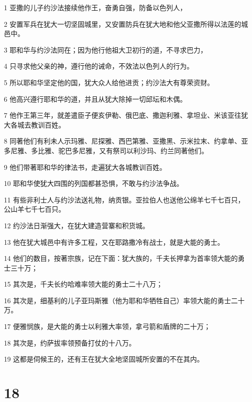 \par 1 亚撒的儿子约沙法接续他作王，奋勇自强，防备以色列人，
\par 2 安置军兵在犹大一切坚固城里，又安置防兵在犹大地和他父亚撒所得以法莲的城邑中。
\par 3 耶和华与约沙法同在；因为他行他祖大卫初行的道，不寻求巴力，
\par 4 只寻求他父亲的神，遵行他的诫命，不效法以色列人的行为。
\par 5 所以耶和华坚定他的国，犹大众人给他进贡；约沙法大有尊荣资财。
\par 6 他高兴遵行耶和华的道，并且从犹大除掉一切邱坛和木偶。
\par 7 他作王第三年，就差遣臣子便亥伊勒、俄巴底、撒迦利雅、拿坦业、米该亚往犹大各城去教训百姓。
\par 8 同著他们有利未人示玛雅、尼探雅、西巴第雅、亚撒黑、示米拉末、约拿单、亚多尼雅、多比雅、驼巴多尼雅，又有祭司以利沙玛、约兰同著他们。
\par 9 他们带著耶和华的律法书，走遍犹大各城教训百姓。
\par 10 耶和华使犹大四围的列国都甚恐惧，不敢与约沙法争战。
\par 11 有些非利士人与约沙法送礼物，纳贡银。亚拉伯人也送他公绵羊七千七百只，公山羊七千七百只。
\par 12 约沙法日渐强大，在犹大建造营寨和积货城。
\par 13 他在犹大城邑中有许多工程，又在耶路撒冷有战士，就是大能的勇士。
\par 14 他们的数目，按著宗族，记在下面：犹大族的，千夫长押拿为首率领大能的勇士三十万；
\par 15 其次是，千夫长约哈难率领大能的勇士二十八万；
\par 16 其次是，细基利的儿子亚玛斯雅（他为耶和华牺牲自己）率领大能的勇士二十万。
\par 17 便雅悯族，是大能的勇士以利雅大率领，拿弓箭和盾牌的二十万；
\par 18 其次是，约萨拔率领预备打仗的十八万。
\par 19 这都是伺候王的，还有王在犹大全地坚固城所安置的不在其内。

\chapter{18}

